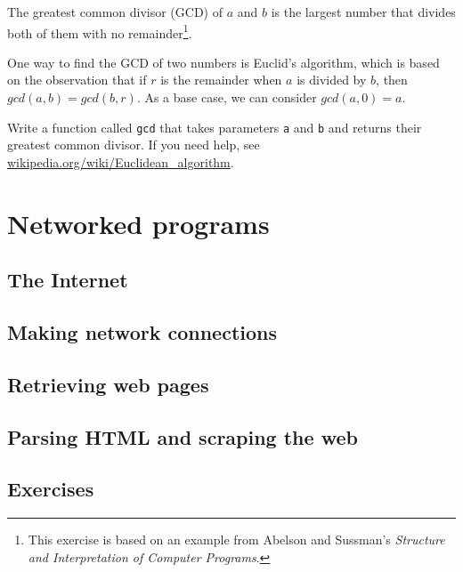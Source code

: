 \documentclass[10pt]{book}
\begin{document}
\begin{ex}


The greatest common divisor (GCD) of $a$ and $b$ is the largest number
that divides both of them with no remainder\footnote{This exercise is
  based on an example from Abelson and Sussman's {\em Structure and
    Interpretation of Computer Programs}.}.

One way to find the GCD of two numbers is Euclid's algorithm,
which is based on the observation that if $r$ is the remainder
when $a$ is divided by $b$, then $gcd(a, b) = gcd(b, r)$.
As a base case, we can consider $gcd(a, 0) = a$.


Write a function called
\verb"gcd" that takes parameters {\tt a} and {\tt b}
and returns their greatest common divisor.  If you need
help, see \url{wikipedia.org/wiki/Euclidean_algorithm}.

\end{ex}





\chapter{Networked programs}

\section{The Internet}

\section{Making network connections}

\section{Retrieving web pages}

\section{Parsing HTML and scraping the web}

\section{Exercises}
\end{document}
